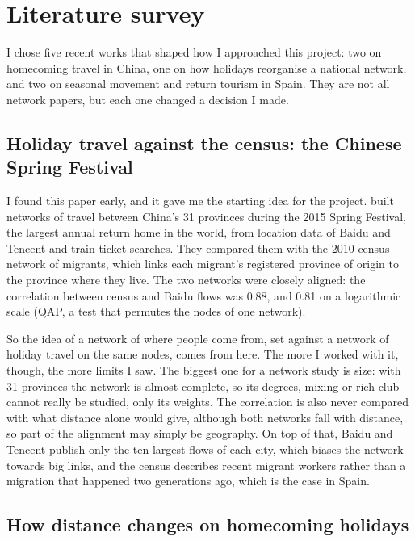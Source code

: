 \section{Literature survey}\label{sec:literature}

I chose five recent works that shaped how I approached this project: two on homecoming travel in China, one on how holidays reorganise a national network, and two on seasonal movement and return tourism in Spain. They are not all network papers, but each one changed a decision I made.

\subsection{Holiday travel against the census: the Chinese Spring Festival}

I found this paper early, and it gave me the starting idea for the project. \citet{li2016spring} built networks of travel between China's 31 provinces during the 2015 Spring Festival, the largest annual return home in the world, from location data of Baidu and Tencent and train-ticket searches. They compared them with the 2010 census network of migrants, which links each migrant's registered province of origin to the province where they live. The two networks were closely aligned: the correlation between census and Baidu flows was 0.88, and 0.81 on a logarithmic scale (QAP, a test that permutes the nodes of one network).

So the idea of a network of where people come from, set against a network of holiday travel on the same nodes, comes from here. The more I worked with it, though, the more limits I saw. The biggest one for a network study is size: with 31 provinces the network is almost complete, so its degrees, mixing or rich club cannot really be studied, only its weights. The correlation is also never compared with what distance alone would give, although both networks fall with distance, so part of the alignment may simply be geography. On top of that, Baidu and Tencent publish only the ten largest flows of each city, which biases the network towards big links, and the census describes recent migrant workers rather than a migration that happened two generations ago, which is the case in Spain.

\subsection{How distance changes on homecoming holidays}

